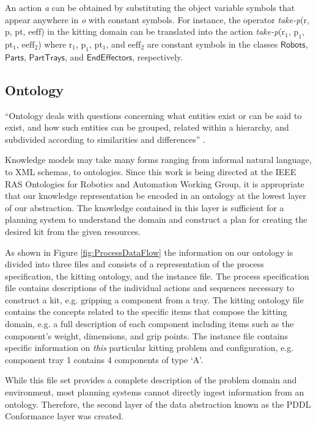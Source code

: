 \documentclass[a4paper, 10pt, conference]{ieeeconf}      %
\begin{document}
An action \textit{a} can be obtained by substituting the object variable symbols that
appear anywhere in \textit{o} with constant symbols. For instance, the operator \textsl{take-p}($\mathrm{r}$, $\mathrm{p}$, $\mathrm{pt}$, $\mathrm{eeff}$) in the kitting domain can be translated into the action \textsl{take-p}($\mathrm{r_1}$, $\mathrm{p_1}$, $\mathrm{pt_1}$, $\mathrm{eeff_2}$) where $\mathrm{r_1}$, $\mathrm{p_1}$, $\mathrm{pt_1}$, and $\mathrm{eeff_2}$ are constant symbols in the classes $\mathsf{Robots}$, $\mathsf{Parts}$, $\mathsf{PartTrays}$, and $\mathsf{EndEffectors}$, respectively.
\subsection{Ontology}
``Ontology deals with questions concerning what entities exist or can be said to exist, and how such entities can be grouped, related within a hierarchy, and subdivided according to similarities and differences'' \cite{ontologyDef}.

Knowledge models may take many forms ranging from informal natural language, to XML schemas, to ontologies.
Since this work is being directed at the IEEE RAS Ontologies for Robotics and Automation Working Group, it is appropriate that our  knowledge representation be
encoded in an ontology at the lowest layer of our abstraction. The knowledge contained in this layer is sufficient for a planning system to understand the domain and construct
a plan for creating the desired kit from the given resources.

As shown in Figure \ref{fig:ProcessDataFlow} the information on our ontology is divided into three files and consists of a representation of the process specification,
the kitting ontology, and the instance file. The process specification file contains descriptions of
the individual actions and sequences necessary to construct a kit, e.g. gripping a component from a tray. The kitting ontology file contains the concepts related to the specific items
that compose the kitting domain, e.g. a full description of each component including items such as the component's weight, dimensions, and grip points. The instance file
contains specific information on {\it this} particular kitting problem and configuration, e.g. component tray 1 contains 4 components of type `A'.

While this file set provides a complete description of the problem domain and environment, most planning systems cannot directly ingest information from an ontology.
Therefore, the second layer of the data abstraction known as the PDDL Conformance layer was created.
\end{document}
